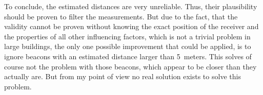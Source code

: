 To conclude, the estimated distances are very unreliable. Thus, their plausibility should be proven to filter the measurements. But due to the fact, that the validity cannot be proven without knowing the exact position of the receiver and the properties of all other influencing factors, which is not a trivial problem in large buildings, the only one possible improvement that could be applied, is to ignore beacons with an estimated distance larger than 5~meters. This solves of course not the problem with those beacons, which appear to be closer than they actually are. But from my point of view no real solution exists to solve this problem.